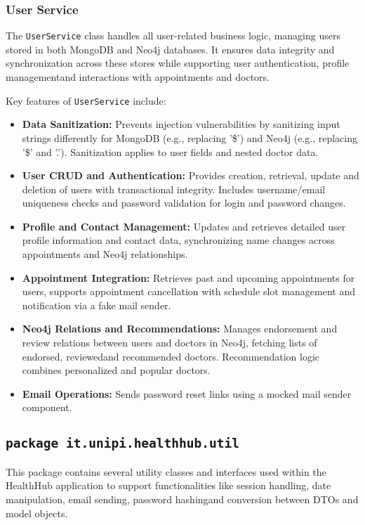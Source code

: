 \subsubsection{User Service}
The \texttt{UserService} class handles all user-related business logic, managing users stored in both MongoDB and Neo4j databases. It ensures data integrity and synchronization across these stores while supporting user authentication, profile managementand interactions with appointments and doctors.

Key features of \texttt{UserService} include:
\begin{itemize}
	\item \textbf{Data Sanitization:} Prevents injection vulnerabilities by sanitizing input strings differently for MongoDB (e.g., replacing '\$') and Neo4j (e.g., replacing '\$' and '.'). Sanitization applies to user fields and nested doctor data.

	\item \textbf{User CRUD and Authentication:} Provides creation, retrieval, update and deletion of users with transactional integrity. Includes username/email uniqueness checks and password validation for login and password changes.  
	
	\item \textbf{Profile and Contact Management:} Updates and retrieves detailed user profile information and contact data, synchronizing name changes across appointments and Neo4j relationships.  
	
	\item \textbf{Appointment Integration:} Retrieves past and upcoming appointments for users, supports appointment cancellation with schedule slot management and notification via a fake mail sender.  
	
	\item \textbf{Neo4j Relations and Recommendations:} Manages endorsement and review relations between users and doctors in Neo4j, fetching lists of endorsed, reviewedand recommended doctors. Recommendation logic combines personalized and popular doctors.  
	
	\item \textbf{Email Operations:} Sends password reset links using a mocked mail sender component.  
\end{itemize}

\subsection{\texttt{package it.unipi.healthhub.util}}
This package contains several utility classes and interfaces used within the HealthHub application to support functionalities like session handling, date manipulation, email sending, password hashingand conversion between DTOs and model objects.

